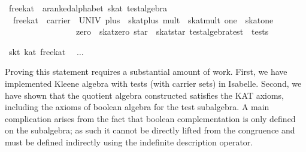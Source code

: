 \documentclass{llncs}
\begin{document}
\begin{isabellebody}
\isamarkupfalse%
\ free{}kat\ {}{}\ {}{}a{}{}ranked{}alphabet\ skat\ test{}algebra{}\ \isanewline
\ \ {}free{}kat\ {}\ {}carrier\ {}\ UNIV{}\ plus\ {}\ skat{}plus{}\ mult\ {}\ skat{}mult{}\ one\ {}\ skat{}one{}\isanewline
\ \ \ \ \ \ \ \ \ \ \ \ \ \ \ \ \ zero\ {}\ skat{}zero{}\ star\ {}\ skat{}star{}\ test{}algebra{}test\ {}\ tests{}{}\isanewline
\end{isabellebody}

\begin{isabellebody}
\isamarkupfalse%
\ skt{}\ kat\ free{}kat\isanewline
\ \ $\dots$\isanewline
\end{isabellebody}

Proving this statement requires a substantial amount of work. First,
we have implemented Kleene algebra with tests (with carrier sets) in
Isabelle. Second, we have shown that the quotient algebra constructed
satisfies the KAT axioms, including the axioms of boolean algebra for
the test subalgebra. A main complication arises from the fact that
boolean complementation is only defined on the subalgebra; as such it
cannot be directly lifted from the congruence and must be defined
indirectly using the indefinite description operator.
\end{document}
